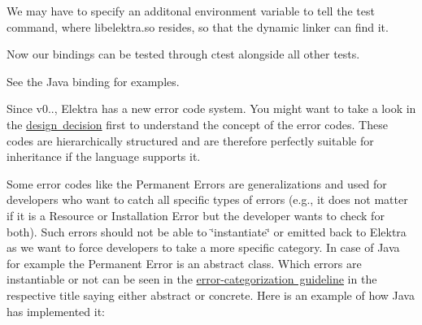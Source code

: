 We may have to specify an additonal environment variable to tell the test command, where {\ttfamily libelektra.\+so} resides, so that the dynamic linker can find it.


\begin{DoxyCode}{0}
\end{DoxyCode}


Now our bindings can be tested through {\ttfamily ctest} alongside all other tests.

See the Java binding for examples.

Since v0.., Elektra has a new error code system. You might want to take a look in the \mbox{\hyperlink{doc_decisions_error_codes_md}{design decision}} first to understand the concept of the error codes. These codes are hierarchically structured and are therefore perfectly suitable for inheritance if the language supports it.

Some error codes like the {\ttfamily Permanent Errors} are generalizations and used for developers who want to catch all specific types of errors (e.\+g., it does not matter if it is a Resource or Installation Error but the developer wants to check for both). Such errors should not be able to \char`\"{}instantiate\char`\"{} or emitted back to Elektra as we want to force developers to take a more specific category. In case of Java for example the {\ttfamily Permanent Error} is an abstract class. Which errors are instantiable or not can be seen in the \mbox{\hyperlink{doc_dev_error-categorization_md}{error-\/categorization guideline}} in the respective title saying either {\ttfamily abstract} or {\ttfamily concrete}. Here is an example of how Java has implemented it\+:


\begin{DoxyCode}{0}
\end{DoxyCode}


